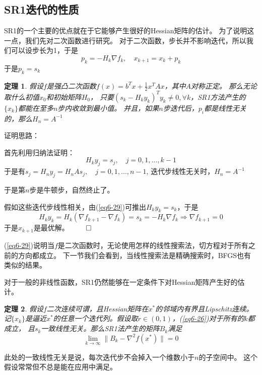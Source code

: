 \documentclass{article}
\newtheorem{thm}{定理}
\begin{document}
\subsection{SR1迭代的性质}
SR1的一个主要的优点就在于它能够产生很好的Hessian矩阵的估计。
为了说明这一点，我们先对二次函数进行研究。
对于二次函数，步长并不影响迭代，所以我们可以设步长为1，于是
\begin{equation}
  \label{eq6-28}
  p_k = -H_k\nabla f_k,\quad x_{k+1} = x_k + p_k
\end{equation}
于是$p_k = s_k$
\begin{thm}
  \label{thm6-1}
  假设$f$是强凸二次函数$f(x) = b^Tx+\frac12x^TAx$，其中$A$对称正定。
  那么无论取什么初值$x_0$和初始矩阵$H_0$，
  只要$(s_k - H_ky_k)^Ty_k\ne0,\forall k$，SR1方法产生的$\{x_k\}$都能在至多$n$步内收敛到最小值。
  并且，如果$n$步迭代后，$p_i$都是线性无关的，那么$H_n = A^{-1}$
\end{thm}
证明思路：

首先利用归纳法证明：
\begin{equation}
  \label{eq6-29}
  H_k y_j = s_j, \quad j = 0,1,\dots,k-1
\end{equation}
于是有$s_j = H_ny_j = H_n A s_j,\quad j = 0,1,\dots,n-1$,
迭代步线性无关时，$H_n = A^{-1}$

于是第$n$步是牛顿步，自然终止了。

假如这些迭代步线性相关，由(\ref{eq6-29})可推出$H_ky_k = s_k$，于是
\[
  H_ky_k = H_k(\nabla f_{k+1}-\nabla f_k) = s_k = -H_k\nabla f_k
  \Rightarrow \nabla f_{k+1} = 0
\]
于是$x_{k+1}$是最优解。 $\qed$

(\ref{eq6-29})说明当$f$是二次函数时，无论使用怎样的线性搜索法，切方程对于所有之前的方向都成立。
下一节我们会看到，当线性搜索法是精确搜索时，BFGS也有类似的结果。

对于一般的非线性函数，SR1仍然能够在一定条件下对Hessian矩阵产生好的估计。

\begin{thm}
  \label{thm6-2}
  假设$f$二次连续可谓，且Hessian矩阵在$x^*$的邻域内有界且Lipschitz连续。
  记$\{x_k\}$是逼近$x^*$的任意一个迭代列。假设取$r\in(0,1)$，(\ref{eq6-26})对于所有的$k$都成立，
  且$s_k$一致线性无关。那么SR1法产生的矩阵$B_k$满足
  \[
    \lim_{k\rightarrow \infty}\|B_k - \nabla^2f(x^*)\| = 0
  \]
\end{thm}
此处的一致线性无关是说，每次迭代步不会掉入一个维数小于$n$的子空间中。
这个假设常常但不总是能在应用中满足。
\end{document}
